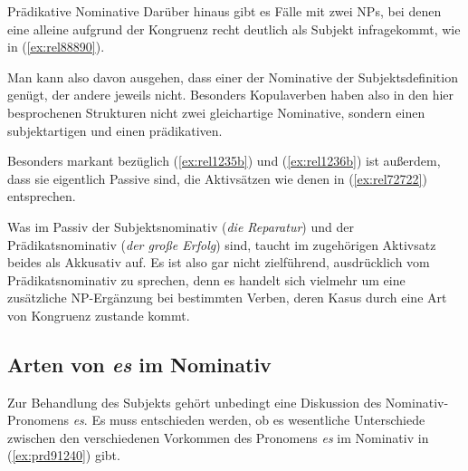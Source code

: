 \begin{Vertiefung}{Prädikative Nominative}
Darüber hinaus gibt es Fälle mit zwei NPs, bei denen eine alleine aufgrund der Kongruenz recht deutlich als Subjekt infragekommt, wie in (\ref{ex:rel88890}).

\begin{exe}
\end{exe}

Man kann also davon ausgehen, dass einer der Nominative der Subjektsdefinition genügt, der andere jeweils nicht.
Besonders Kopulaverben haben also in den hier besprochenen Strukturen nicht zwei gleichartige Nominative, sondern einen subjektartigen und einen prädikativen.

Besonders markant bezüglich (\ref{ex:rel1235b}) und (\ref{ex:rel1236b}) ist außerdem, dass sie eigentlich Passive sind, die Aktivsätzen wie denen in (\ref{ex:rel72722}) entsprechen.

\begin{exe}
  \ex\label{ex:rel72722}
  \begin{xlist}
  \end{xlist}
\end{exe}

Was im Passiv der Subjektsnominativ (\textit{die Reparatur}) und der Prädikatsnominativ (\textit{der große Erfolg}) sind, taucht im zugehörigen Aktivsatz beides als Akkusativ auf.
Es ist also gar nicht zielführend, ausdrücklich vom Prädikatsnominativ zu sprechen, denn es handelt sich vielmehr um eine zusätzliche NP-Ergänzung bei bestimmten Verben, deren Kasus durch eine Art von Kongruenz zustande kommt.

\end{Vertiefung}

\subsection{Arten von \textit{es} im Nominativ}

\label{sec:expletiva}

Zur Behandlung des Subjekts gehört unbedingt eine Diskussion des Nominativ-Pronomens \textit{es}.
Es muss entschieden werden, ob es wesentliche Unterschiede zwischen den verschiedenen Vorkommen des Pronomens \textit{es} im Nominativ in (\ref{ex:prd91240}) gibt.

